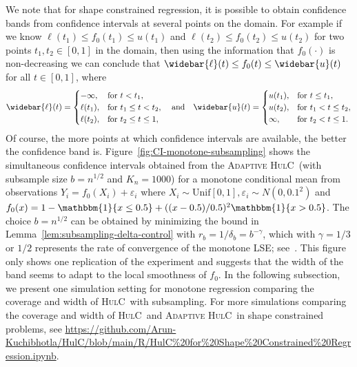 \documentclass{article}
\newcommand{\hulc}{\textsc{HulC}~}
\newcommand{\ahulc}{\textsc{Adaptive HulC}~}
\numberwithin{myalgctr}{section}
\begin{document}
We note that for shape constrained regression, it is possible to obtain confidence bands from confidence intervals at several points on the domain. For example if we know $\ell(t_1) \le f_0(t_1) \le u(t_1)$ and $\ell(t_2) \le f_0(t_2) \le u(t_2)$ for two points $t_1, t_2\in[0,1]$ in the domain, then using the information {\color{black}that} $f_0(\cdot)$ is non-decreasing we can conclude that $\widebar{\ell}(t) \le f_0(t) \le \widebar{u}(t)$ for all $t\in[0, 1]$, where
\begin{equation}\label{eq:interval-to-band-monotone}
\widebar{\ell}(t) = \begin{cases}-\infty,&\mbox{for }t < t_1,\\
\ell(t_1),&\mbox{for }t_1 \le t < t_2,\\
\ell(t_2), &\mbox{for }t_2 \le t \le 1,\end{cases}\quad\mbox{and}\quad \widebar{u}(t) = \begin{cases}u(t_1),&\mbox{for }t \le t_1,\\
u(t_2),&\mbox{for }t_1 < t \le t_2,\\
\infty, &\mbox{for }t_2 < t \le 1.\end{cases}
\end{equation}
Of course, the more points at which confidence intervals are available, the better the confidence band is. Figure~\ref{fig:CI-monotone-subsampling} shows the simultaneous confidence intervals obtained from the \ahulc (with subsample size $b=n^{1/2}$ and $K_n=1000$) for a monotone conditional mean from observations $Y_i = f_0(X_i) + \varepsilon_i$ where $X_i\sim \mbox{Unif}[0, 1], \varepsilon_i\sim N(0, 0.1^2)$ and $f_0(x) = 1-\mathbbm{1}\{x\le0.5\}+ ((x-0.5)/0.5)^2\mathbbm{1}\{x>0.5\}$. {\color{black}The choice $b = n^{1/2}$ can be obtained by minimizing the bound in Lemma~\ref{lem:subsampling-delta-control} with $r_b = 1/\delta_b = b^{-\gamma}$, which with $\gamma = 1/3$ or $1/2$ represents the rate of convergence of the monotone LSE; see~\cite{han2019berry}.} This figure only shows one replication of the experiment and suggests that the width of the band seems to adapt to the local smoothness of $f_0$. {\color{black}In the following subsection, we present one simulation setting for monotone regression comparing the coverage and width of \hulc with subsampling. For more simulations comparing the coverage and width of \hulc and \ahulc in shape constrained problems, see \url{https://github.com/Arun-Kuchibhotla/HulC/blob/main/R/HulC%20for%20Shape%20Constrained%20Regression.ipynb}.}
\end{document}
